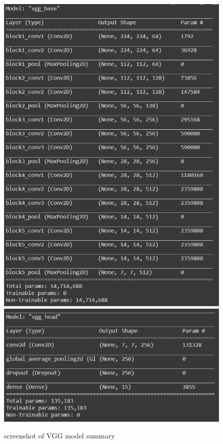 \begin{figure}[htbp]
    \centering
    \includegraphics[scale=0.65]{vgg_1.png}
    \includegraphics[scale=0.65]{vgg_2.png}
    \caption{screenshot of VGG model summary}
    \label{fig:vgg_summary}
\end{figure}

